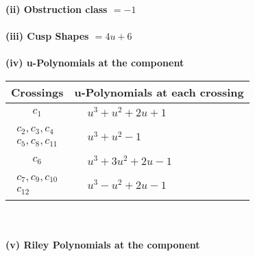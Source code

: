 \documentclass[1p]{elsarticle_modified}
\theoremstyle{definition}
\begin{document}
\flushleft \textbf{(ii) Obstruction class $= -1$}\\~\\
\flushleft \textbf{(iii) Cusp Shapes $= 4 u+6$}\\~\\
\newpage\renewcommand{\arraystretch}{1}
\flushleft \textbf{(iv) u-Polynomials at the component}\newline \\
\begin{tabular}{m{50pt}|m{274pt}}
Crossings & \hspace{64pt}u-Polynomials at each crossing \\
\hline $$\begin{aligned}c_{1}\end{aligned}$$&$\begin{aligned}
&u^3+u^2+2 u+1
\end{aligned}$\\
\hline $$\begin{aligned}c_{2},c_{3},c_{4}\\c_{5},c_{8},c_{11}\end{aligned}$$&$\begin{aligned}
&u^3+u^2-1
\end{aligned}$\\
\hline $$\begin{aligned}c_{6}\end{aligned}$$&$\begin{aligned}
&u^3+3 u^2+2 u-1
\end{aligned}$\\
\hline $$\begin{aligned}c_{7},c_{9},c_{10}\\c_{12}\end{aligned}$$&$\begin{aligned}
&u^3- u^2+2 u-1
\end{aligned}$\\
\hline
\end{tabular}\\~\\
\newpage\renewcommand{\arraystretch}{1}
\flushleft \textbf{(v) Riley Polynomials at the component}\newline \\
\end{document}
